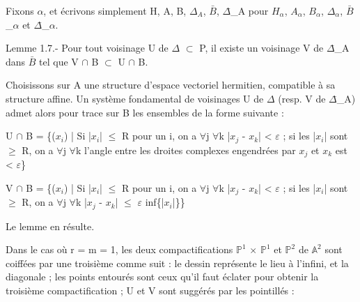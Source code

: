 \documentclass[10pt,a4paper]{article}
\begin{document}
\begin{adjustbox}{max totalsize={\textwidth}{0.945\textheight},center}
\begin{minipage}{\textwidth}
\noindent Fixons \ensuremath{α}, et écrivons simplement H, A, B, \ensuremath{Δ_A}, \ensuremath{\bar{B}}, \ensuremath{Δ}̄\allowbreak\_A pour \ensuremath{H_α}, \ensuremath{A_α}, \ensuremath{B_α}, \ensuremath{Δ_α}, \ensuremath{\bar{B}}\allowbreak\_\ensuremath{α} et \ensuremath{Δ}̄\allowbreak\_\ensuremath{α}.\par\smallskip
\noindent Lemme 1.7.- Pour tout voisinage U de \ensuremath{Δ} \ensuremath{⊂} P, il existe un voisinage V de \ensuremath{Δ}̄\allowbreak\_A dans \ensuremath{\bar{B}} tel que V \ensuremath{∩} B \ensuremath{⊂} U \ensuremath{∩} B.\par\smallskip
\noindent Choisissons sur A une structure d'espace vectoriel hermitien, compatible à sa structure affine. Un système fondamental de voisinages U de \ensuremath{Δ} (resp. V de \ensuremath{Δ}̄\allowbreak\_A) admet alors pour trace sur B les ensembles de la forme suivante :\par\smallskip
\noindent U \ensuremath{∩} B = \{(\ensuremath{x_i}) | Si |\ensuremath{x_i}| \ensuremath{≤} R pour un i, on a \ensuremath{∀}j \ensuremath{∀}k |\ensuremath{x_j} - \ensuremath{x_k}| < \ensuremath{ε} ; si les |\ensuremath{x_i}| sont \ensuremath{≥} R, on a \ensuremath{∀}j \ensuremath{∀}k l'angle entre les droites complexes engendrées par \ensuremath{x_j} et \ensuremath{x_k} est < \ensuremath{ε}\}\par\smallskip
\noindent V \ensuremath{∩} B = \{(\ensuremath{x_i}) | Si |\ensuremath{x_i}| \ensuremath{≤} R pour un i, on a \ensuremath{∀}j \ensuremath{∀}k |\ensuremath{x_j} - \ensuremath{x_k}| < \ensuremath{ε} ; si les |\ensuremath{x_i}| sont \ensuremath{≥} R, on a \ensuremath{∀}j \ensuremath{∀}k |\ensuremath{x_j} - \ensuremath{x_k}| \ensuremath{≤} \ensuremath{ε} inf\{|\ensuremath{x_i}|\}\}\par\smallskip
\noindent Le lemme en résulte.\par\smallskip
\noindent Dans le cas où r = m = 1, les deux compactifications \ensuremath{ℙ^1} \ensuremath{×} \ensuremath{ℙ^1} et \ensuremath{ℙ^2} de \ensuremath{𝔸^2} sont coiffées par une troisième comme suit : le dessin représente le lieu à l'infini, et la diagonale ; les points entourés sont ceux qu'il faut éclater pour obtenir la troisième compactification ; U et V sont suggérés par les pointillés :\par\smallskip
\end{minipage}
\end{adjustbox}
\newpage
\end{document}
